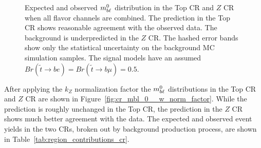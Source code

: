 \begin{figure}
  \centering
  \caption{Expected and observed $m_{b\ell}^0$ distribution in the Top CR and
    $Z$ CR when all flavor channels are combined.
    The prediction in the Top CR shows reasonable agreement with the observed
    data.
    The background is underpredicted in the $Z$ CR.
    The hashed error bands show only the statistical uncertainty on the
    background MC simulation samples.
    The signal models have an assumed
    $Br(\tilde{t}\rightarrow be) = Br(\tilde{t}\rightarrow b\mu) = 0.5$.
  }
  \label{fig:cr_mbl_0__no_norm_factor}
\end{figure}

After applying the $k_Z$ normalization factor the $m_{b\ell}^0$ distributions in
the Top CR and $Z$ CR are shown in Figure~\ref{fig:cr_mbl_0__w_norm_factor}.
While the prediction is roughly unchanged in the Top CR, the prediction in the
$Z$ CR shows much better agreement with the data.
The expected and observed event yields in the two CRs, broken out by background
production process, are shown in Table~\ref{tab:region_contributions_cr}.


